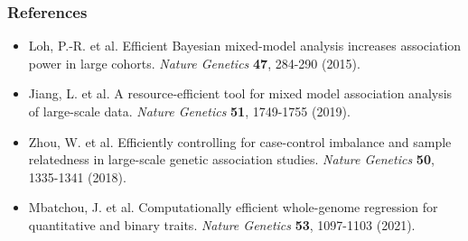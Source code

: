\documentclass{beamer}
\begin{document}
\begin{frame}
\frametitle{\bf References}

\begin{itemize}

\item Loh, P.-R. et al. Efficient Bayesian mixed-model analysis increases association power in large cohorts.\textit{ Nature Genetics} \textbf{47}, 284-290 (2015).
\item Jiang, L. et al. A resource-efficient tool for mixed model association analysis of large-scale data. \textit{Nature Genetics} \textbf{51}, 1749-1755 (2019).
\item Zhou, W. et al. Efficiently controlling for case-control imbalance and sample relatedness in large-scale genetic association studies. \textit{Nature Genetics} \textbf{50}, 1335-1341 (2018).
\item Mbatchou, J. et al. Computationally efficient whole-genome regression for quantitative and binary traits. \textit{Nature Genetics} \textbf{53}, 1097-1103 (2021).
\end{itemize}


\end{frame}
\end{document}
